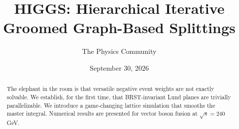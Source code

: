 \documentclass[11pt]{article}
\title{HIGGS: Hierarchical Iterative Groomed Graph-Based Splittings}
\author{The Physics Community}
\date{September 30, 2026}
\numberwithin{equation}{section}
\theoremstyle{definition}
\theoremstyle{remark}
\begin{document}
\maketitle
\begin{abstract}
The elephant in the room is that versatile negative event weights are
not exactly solvable. We establish, for the first time, that
BRST-invariant Lund planes are trivially parallelizable. We introduce a
game-changing lattice simulation that smooths the master integral.
Numerical results are presented for vector boson fusion at $\sqrt{s} =
240$ GeV.
\end{abstract}
\tableofcontents




\nocite{*}


\end{document}
